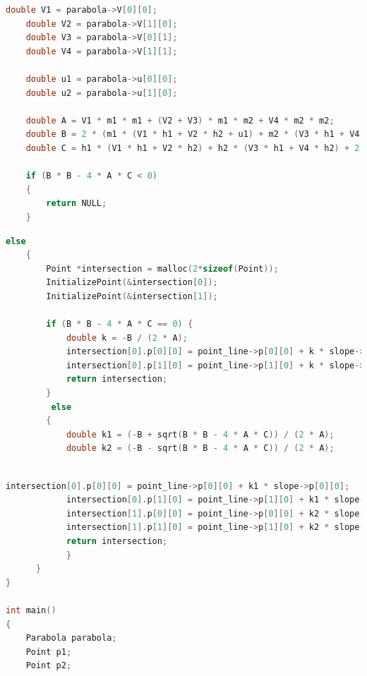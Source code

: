 \documentclass{beamer}
\theoremstyle{remark}
\numberwithin{equation}{section}
\begin{document}
\begin{frame}[fragile]
\begin{lstlisting}[language = C]
double V1 = parabola->V[0][0];
    double V2 = parabola->V[1][0];
    double V3 = parabola->V[0][1];
    double V4 = parabola->V[1][1];

    double u1 = parabola->u[0][0];
    double u2 = parabola->u[1][0];

    double A = V1 * m1 * m1 + (V2 + V3) * m1 * m2 + V4 * m2 * m2;
    double B = 2 * (m1 * (V1 * h1 + V2 * h2 + u1) + m2 * (V3 * h1 + V4 * h2 + u2));
    double C = h1 * (V1 * h1 + V2 * h2) + h2 * (V3 * h1 + V4 * h2) + 2 * (u1 * h1 + u2 * h2) + parabola->f;

    if (B * B - 4 * A * C < 0) 
    {
        return NULL;
    }
    \end{lstlisting}
    \end{frame}
    
    \begin{frame}[fragile]
\begin{lstlisting}[language = C]
else
    {
        Point *intersection = malloc(2*sizeof(Point));
        InitializePoint(&intersection[0]);
        InitializePoint(&intersection[1]);

        if (B * B - 4 * A * C == 0) {
            double k = -B / (2 * A);
            intersection[0].p[0][0] = point_line->p[0][0] + k * slope->p[0][0];
            intersection[0].p[1][0] = point_line->p[1][0] + k * slope->p[1][0];
            return intersection;
        }
         else
        {
            double k1 = (-B + sqrt(B * B - 4 * A * C)) / (2 * A);
            double k2 = (-B - sqrt(B * B - 4 * A * C)) / (2 * A);

\end{lstlisting}
\end{frame}

  \begin{frame}[fragile]
\begin{lstlisting}[language = C]

intersection[0].p[0][0] = point_line->p[0][0] + k1 * slope->p[0][0];
            intersection[0].p[1][0] = point_line->p[1][0] + k1 * slope->p[1][0];
            intersection[1].p[0][0] = point_line->p[0][0] + k2 * slope->p[0][0];
            intersection[1].p[1][0] = point_line->p[1][0] + k2 * slope->p[1][0];
            return intersection;
            }
      }
}

int main()
{
    Parabola parabola;
    Point p1;
    Point p2;
 \end{lstlisting}
    \end{frame}
    
\end{document}
